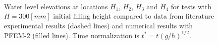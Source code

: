 \documentclass[a4paper,conference]{IEEEtran}
\begin{document}
  \begin{figure}
  \centering
     \\
   \caption{Water level elevations at locations $H_1$, $H_2$, $H_3$ and $H_4$ for tests with $H=300[mm]$ initial filling height compared to data from literature experimental results\cite{Lobovsky13} (dashed lines) and numerical results with PFEM-2 (filled lines). Time normalization is $t^*=t(g/h)^{1/2}$.}
   \label{fg:dambreak-h}                %
\end{figure}
\end{document}

